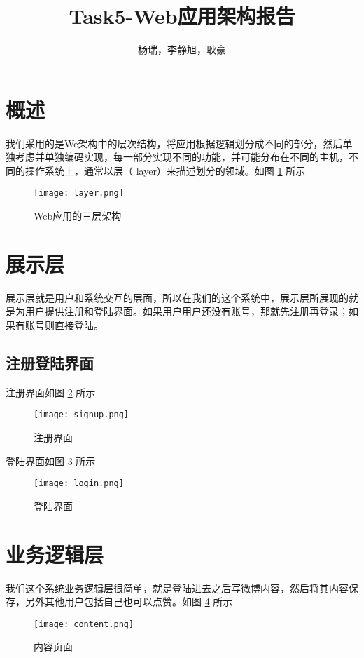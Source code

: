 \documentclass[]{article}
\title{Task5-Web应用架构报告}
\author{杨瑞，李静旭，耿豪}
\begin{document}
\maketitle

\section{概述}
我们采用的是We架构中的层次结构，将应用根据逻辑划分成不同的部分，然后单独考虑并单独编码实现，每一部分实现不同的功能，并可能分布在不同的主机，不同的操作系统上，通常以层（ layer）来描述划分的领域。如图 \ref{fig:graph1} 所示
\begin{figure}[h]
	\centering
	\texttt{[image: layer.png]}
	\caption{Web应用的三层架构}
	\label{fig:graph1}
\end{figure}

\section{展示层}
展示层就是用户和系统交互的层面，所以在我们的这个系统中，展示层所展现的就是为用户提供注册和登陆界面。如果用户用户还没有账号，那就先注册再登录；如果有账号则直接登陆。

\subsection{注册登陆界面}
注册界面如图 \ref{fig:graph2} 所示

\begin{figure}[h]
	\centering
	\texttt{[image: signup.png]}
	\caption{注册界面}
	\label{fig:graph2}
\end{figure}

登陆界面如图 \ref{fig:graph3} 所示

\begin{figure}[h]
	\centering
	\texttt{[image: login.png]}
	\caption{登陆界面}
	\label{fig:graph3}
\end{figure}


\section{业务逻辑层}
我们这个系统业务逻辑层很简单，就是登陆进去之后写微博内容，然后将其内容保存，另外其他用户包括自己也可以点赞。如图 \ref{fig:graph4} 所示

\begin{figure}[h]
	\centering
	\texttt{[image: content.png]}
	\caption{内容页面}
	\label{fig:graph4}
\end{figure}
\end{document}
